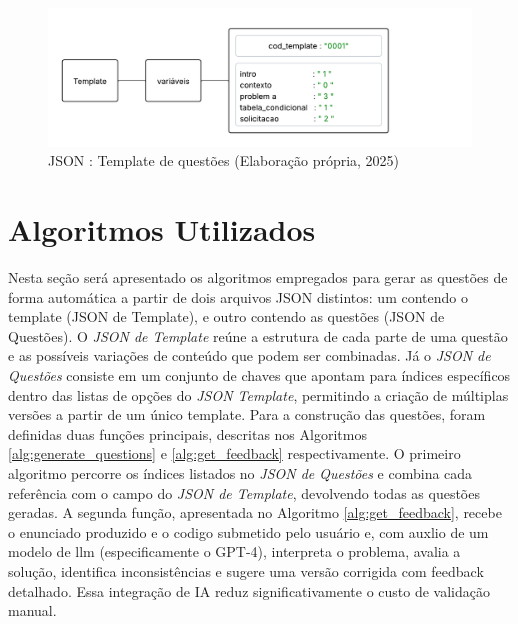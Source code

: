 \begin{figure}[ht]
	\centering
	\includegraphics[width=18cm]{./imagens/capitulo5/template-2}
	\caption{JSON : Template de questões (Elaboração própria, 2025) }
	\label{fig:template-2}
\end{figure}

\section{Algoritmos Utilizados}

Nesta seção será apresentado os algoritmos empregados para gerar as questões de forma automática a partir de dois arquivos JSON distintos: um contendo o template (JSON de Template), e outro contendo as questões (JSON de Questões). O \textit{JSON de Template} reúne a estrutura de cada parte de uma questão e as possíveis variações de conteúdo que podem ser combinadas. Já o \textit{JSON de Questões} consiste em um conjunto de chaves que apontam para índices específicos dentro das listas de opções do \textit{JSON Template}, permitindo a criação de múltiplas versões a partir de um único template. 
Para a construção das questões, foram definidas duas funções principais, descritas nos Algoritmos \ref{alg:generate_questions} e \ref{alg:get_feedback}  respectivamente.   
O primeiro algoritmo percorre os índices listados no \textit{JSON de Questões} e combina cada referência com o campo do \textit{JSON de Template}, devolvendo todas as questões geradas.  
A segunda função, apresentada no Algoritmo \ref{alg:get_feedback}, recebe o enunciado produzido e o codigo submetido pelo usuário e, com auxlio de um modelo de \gls{llm} (especificamente o GPT-4), interpreta o problema, avalia a solução, identifica inconsistências e sugere uma versão corrigida com feedback detalhado. Essa integração de IA reduz significativamente o custo de validação manual.

